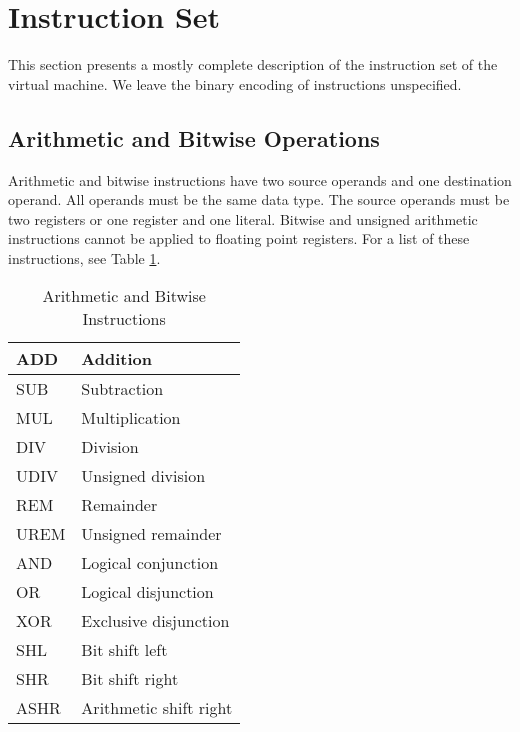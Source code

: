 \section{Instruction Set}

This section presents a mostly complete description
of the instruction set of the virtual machine.
We leave the binary encoding of instructions unspecified.

\subsection{Arithmetic and Bitwise Operations}

Arithmetic and bitwise instructions have two source operands and
one destination operand. All operands must be the same data type.
The source operands must be two registers or one register and one literal.
Bitwise and unsigned arithmetic instructions cannot be applied to
floating point registers. For a list of these instructions,
see Table \ref{ArithmeticAndBitwiseInstructions}.

\begin{table}[h!]
  \begin{center}
    \begin{tabular}{|l|l|}
      \hline
      ADD  & Addition               \\ \hline
      SUB  & Subtraction            \\ \hline
      MUL  & Multiplication         \\ \hline
      DIV  & Division               \\ \hline
      UDIV & Unsigned division      \\ \hline
      REM  & Remainder              \\ \hline
      UREM & Unsigned remainder     \\ \hline
      AND  & Logical conjunction     \\ \hline
      OR   & Logical disjunction    \\ \hline
      XOR  & Exclusive disjunction  \\ \hline
      SHL  & Bit shift left         \\ \hline
      SHR  & Bit shift right        \\ \hline
      ASHR & Arithmetic shift right \\ \hline
    \end{tabular}
  \end{center}
  \caption{Arithmetic and Bitwise Instructions}
  \label{ArithmeticAndBitwiseInstructions}
\end{table}

